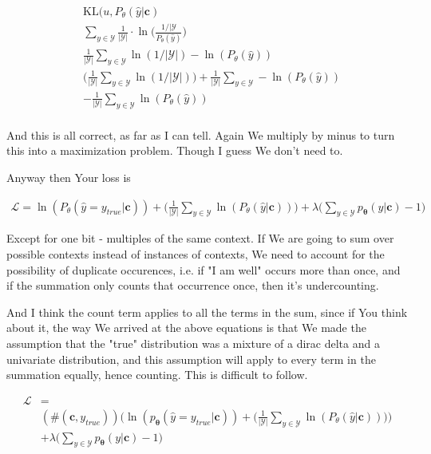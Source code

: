 \documentclass{article}
\newcommand{\KL}{\mathrm{KL}}
\newcommand{\vtheta}{\boldsymbol{\theta}}
\newcommand{\model}{p_{\vtheta}}
\newcommand{\context}{\boldsymbol{c}}
\begin{document}
		\begin{align}
			& \KL(u, P_\theta(\hat{y}|\context)\\
			& \sum_{y\in\mathcal{Y}} \frac{1}{|\mathcal{Y}|} \cdot \ln\bigg(\frac{1/|\mathcal{Y}}{P_\theta(\hat{y})} \bigg)\\
			& \frac{1}{|\mathcal{Y}|} \sum_{y\in\mathcal{Y}}   \ln(1/|\mathcal{Y}|) - \ln(P_\theta(\hat{y}) )\\
			& \bigg(\frac{1}{|\mathcal{Y}|} \sum_{y\in\mathcal{Y}}   \ln(1/|\mathcal{Y}|)\bigg)  + \frac{1}{|\mathcal{Y}|} \sum_{y\in\mathcal{Y}} - \ln(P_\theta(\hat{y}) )\\
			& - \frac{1}{|\mathcal{Y}|} \sum_{y\in\mathcal{Y}} \ln(P_\theta(\hat{y}) )\\
		\end{align}
		
		And this is all correct, as far as I can tell. Again We multiply by minus to turn this into a maximization problem. Though I guess We don't need to.
		
		Anyway then Your loss is
		
		\begin{align}
			\mathcal{L} = \ln(P_\theta(\hat{y} = y_{true}|\context)) + \bigg(\frac{1}{|\mathcal{Y}|} \sum_{y\in\mathcal{Y}} \ln(P_\theta(\hat{y} | \context) )\bigg) + \lambda\bigg(\sum_{y\in\mathcal{Y}}\model(y|\context) - 1 \bigg)
		\end{align}
		
		Except for one bit - multiples of the same context. If We are going to sum over possible contexts instead of instances of contexts, We need to account for the possibility of duplicate occurences, i.e. if "I am well" occurs more than once, and if the summation only counts that occurrence once, then it's undercounting. 
		
		And I think the count term applies to all the terms in the sum, since if You think about it, the way We arrived at the above equations is that We made the assumption that the "true" distribution was a mixture of a dirac delta and a univariate distribution, and this assumption will apply to every term in the summation equally, hence counting. This is difficult to follow.
		
		\begin{align}
			\mathcal{L} &=\\			
			&(\#(\context, y_{true}))\bigg(\ln(\model(\hat{y} = y_{true}|\context)) + \bigg(\frac{1}{|\mathcal{Y}|} \sum_{y\in\mathcal{Y}} \ln(P_\theta(\hat{y} | \context) )\bigg)\bigg) \\
			&+ \lambda\bigg(\sum_{y\in\mathcal{Y}}\model(y|\context) - 1 \bigg)
		\end{align}
		
\end{document}
